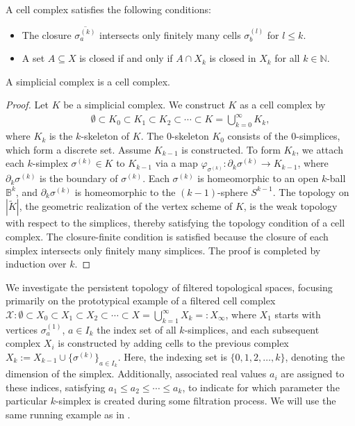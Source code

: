 \begin{remark}
A cell complex satisfies the following conditions:
\begin{itemize}
    \item The closure \(\overline{\sigma^{(k)}_a}\) intersects only finitely many cells \(\sigma^{(l)}_b\) for \(l \leq k\).
    \item A set \(A \subseteq X\) is closed if and only if \(A \cap X_k\) is closed in \(X_k\) for all \(k \in \mathbb{N}\).
\end{itemize}
\end{remark}

\begin{proposition}
A simplicial complex is a cell complex.
\end{proposition}

\begin{proof}
Let \(K\) be a simplicial complex. We construct \(K\) as a cell complex by
\begin{align}
\emptyset \subset K_0 \subset K_1 \subset K_2 \subset \cdots \subset K = \bigcup_{k=0}^{\infty} K_k,
\end{align}
where \(K_k\) is the \(k\)-skeleton of \(K\). The $0$-skeleton \(K_0\) consists of the $0$-simplices, which form a discrete set. Assume \(K_{k-1}\) is constructed. To form \(K_k\), we attach each \(k\)-simplex \(\sigma^{(k)} \in K\) to \(K_{k-1}\) via a map \(\varphi_{\sigma^{(k)}} : \partial_k \sigma^{(k)} \to K_{k-1}\), where \(\partial_k \sigma^{(k)}\) is the boundary of \(\sigma^{(k)}\). Each \(\sigma^{(k)}\) is homeomorphic to an open \(k\)-ball \(\mathbb{B}^k\), and \(\partial_k \sigma^{(k)}\) is homeomorphic to the \((k-1)\)-sphere \(S^{k-1}\). The topology on \(|\tilde{K}|\), the geometric realization of the vertex scheme of \(K\), is the weak topology with respect to the simplices, thereby satisfying the topology condition of a cell complex. The closure-finite condition is satisfied because the closure of each simplex intersects only finitely many simplices. The proof is completed by induction over $k$.
\end{proof}

We investigate the persistent topology of filtered topological spaces, focusing primarily on the prototypical example of a filtered cell complex $\mathcal{X}: \emptyset \subset X_{0} \subset X_{1} \subset X_{2} \subset \cdots \subset X = \bigcup_{k=1}^{\infty} X_{k} =: X_\infty$, where \(X_{1}\) starts with vertices \(\sigma^{(1)}_a\), $a \in I_k$ the index set of all $k$-simplices, and each subsequent complex \(X_{i}\) is constructed by adding cells to the previous complex $X_{k} := X_{k-1} \cup \{\sigma^{(k)}\}_{a \in I_k}$. Here, the indexing set is \(\{0, 1, 2, \ldots, k\}\), denoting the dimension of the simplex. Additionally, associated real values \(a_{i}\) are assigned to these indices, satisfying \(a_{1} \leq a_{2} \leq \cdots \leq a_{k}\), to indicate for which parameter the particular $k$-simplex is created during some filtration process. We will use the same running example as in \cite[\S 2.2, Example]{de2011dualities}.

